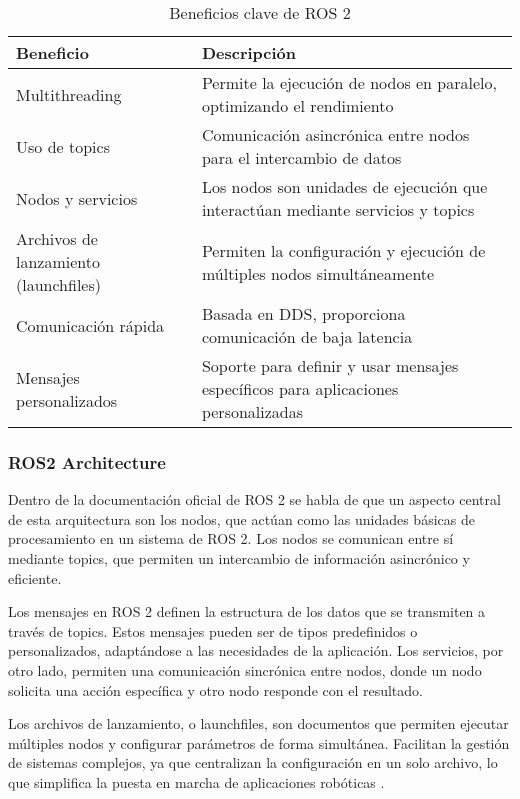     \begin{table}[h!]
    \centering
    \caption{Beneficios clave de ROS 2}
    \begin{tabular}{|l|p{10cm}|}
    \hline
    \textbf{Beneficio} & \textbf{Descripción} \\
    \hline
    Multithreading & Permite la ejecución de nodos en paralelo, optimizando el rendimiento \\
    \hline
    Uso de topics & Comunicación asincrónica entre nodos para el intercambio de datos \\
    \hline
    Nodos y servicios & Los nodos son unidades de ejecución que interactúan mediante servicios y topics \\
    \hline
    Archivos de lanzamiento (launchfiles) & Permiten la configuración y ejecución de múltiples nodos simultáneamente \\
    \hline
    Comunicación rápida & Basada en DDS, proporciona comunicación de baja latencia \\
    \hline
    Mensajes personalizados & Soporte para definir y usar mensajes específicos para aplicaciones personalizadas \\
    \hline
    \end{tabular}
    \label{table}
    \end{table}

    \subsubsection{ROS2 Architecture}

    Dentro de la documentación oficial de ROS 2 se habla de que un aspecto central de esta arquitectura son los nodos, que actúan como las unidades básicas de procesamiento en un sistema de ROS 2. Los nodos se comunican entre sí mediante topics, que permiten un intercambio de información asincrónico y eficiente.

    Los mensajes en ROS 2 definen la estructura de los datos que se transmiten a través de topics. Estos mensajes pueden ser de tipos predefinidos o personalizados, adaptándose a las necesidades de la aplicación. Los servicios, por otro lado, permiten una comunicación sincrónica entre nodos, donde un nodo solicita una acción específica y otro nodo responde con el resultado.

    Los archivos de lanzamiento, o launchfiles, son documentos que permiten ejecutar múltiples nodos y configurar parámetros de forma simultánea. Facilitan la gestión de sistemas complejos, ya que centralizan la configuración en un solo archivo, lo que simplifica la puesta en marcha de aplicaciones robóticas \cite{ros_docs}.


